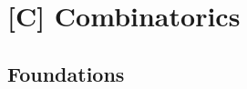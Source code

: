 \documentclass[../../../main.tex]{subfiles}
\begin{document}
\chapter{[C] Combinatorics}


\section{Foundations}
\end{document}
